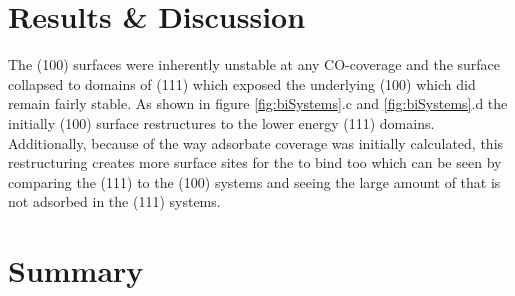 \section{Results \& Discussion}
The (100) surfaces were inherently unstable at any CO-coverage and the surface
 collapsed to domains of (111) which exposed the underlying (100)
 which did remain fairly stable. As shown in figure
\ref{fig:biSystems}.c and \ref{fig:biSystems}.d the initially (100) surface
restructures to the lower energy (111) domains. Additionally, because of the
way adsorbate coverage was initially calculated, this restructuring creates
more surface sites for the  to bind too which can be seen by comparing
the (111) to the (100) systems and seeing the large amount of  that is
not adsorbed in the (111) systems.


\section{Summary}
